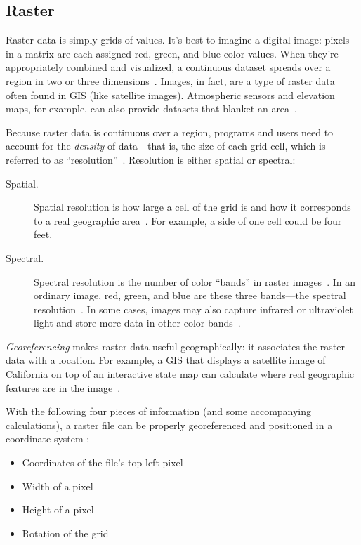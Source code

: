 \subsection{Raster}
\label{sec:raster}
Raster data is simply grids of values. It's best to imagine a digital image: pixels in a matrix are each assigned red, green, and blue color values. When they're appropriately combined and visualized, a continuous dataset spreads over a region in two or three dimensions~\cite{gentle_intro}. Images, in fact, are a type of raster data often found in GIS (like satellite images). Atmospheric sensors and elevation maps, for example, can also provide datasets that blanket an area~\cite{gentle_intro}.

Because raster data is continuous over a region, programs and users need to account for the \textit{density} of data---that is, the size of each grid cell, which is referred to as ``resolution''~\cite{gentle_intro}. Resolution is either spatial or spectral:

\begin{description}
  \item[Spatial.] Spatial resolution is how large a cell of the grid is and how it corresponds to a real geographic area~\cite{gentle_intro}. For example, a side of one cell could be four feet.
  \item[Spectral.] Spectral resolution is the number of color ``bands'' in raster images~\cite{gentle_intro}. In an ordinary image, red, green, and blue are these three bands---the spectral resolution~\cite{gentle_intro}. In some cases, images may also capture infrared or ultraviolet light and store more data in other color bands~\cite{gentle_intro}.
\end{description}

\textit{Georeferencing} makes raster data useful geographically: it associates the raster data with a location. For example, a GIS that displays a satellite image of California on top of an interactive state map can calculate where real geographic features are in the image~\cite{gentle_intro}.

With the following four pieces of information (and some accompanying calculations), a raster file can be properly georeferenced and positioned in a coordinate system \cite{gentle_intro}:

\begin{itemize}
  \item Coordinates of the file's top-left pixel
  \item Width of a pixel
  \item Height of a pixel
  \item Rotation of the grid
\end{itemize}

